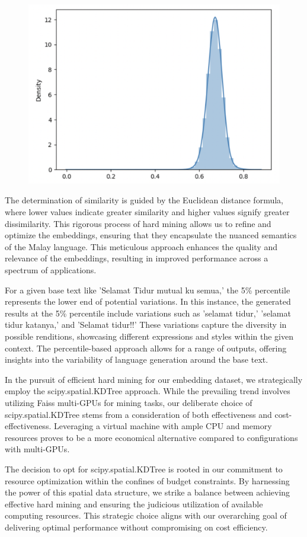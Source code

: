 \documentclass[preprint]{article}
\begin{document}
\begin{figure}[h]
  \centering
  \includegraphics[width=0.6\linewidth]{img/distribution.png}
\end{figure}

The determination of similarity is guided by the Euclidean distance formula, where lower values indicate greater similarity and higher values signify greater dissimilarity. This rigorous process of hard mining allows us to refine and optimize the embeddings, ensuring that they encapsulate the nuanced semantics of the Malay language. This meticulous approach enhances the quality and relevance of the embeddings, resulting in improved performance across a spectrum of applications.

For a given base text like 'Selamat Tidur mutual ku semua,' the 5\% percentile represents the lower end of potential variations. In this instance, the generated results at the 5\% percentile include variations such as 'selamat tidur,' 'selamat tidur katanya,' and 'Selamat tidur!!' These variations capture the diversity in possible renditions, showcasing different expressions and styles within the given context. The percentile-based approach allows for a range of outputs, offering insights into the variability of language generation around the base text.

\pagebreak

In the pursuit of efficient hard mining for our embedding dataset, we strategically employ the scipy.spatial.KDTree approach. While the prevailing trend involves utilizing Faiss multi-GPUs for mining tasks, our deliberate choice of scipy.spatial.KDTree stems from a consideration of both effectiveness and cost-effectiveness. Leveraging a virtual machine with ample CPU and memory resources proves to be a more economical alternative compared to configurations with multi-GPUs.

The decision to opt for scipy.spatial.KDTree is rooted in our commitment to resource optimization within the confines of budget constraints. By harnessing the power of this spatial data structure, we strike a balance between achieving effective hard mining and ensuring the judicious utilization of available computing resources. This strategic choice aligns with our overarching goal of delivering optimal performance without compromising on cost efficiency.
\end{document}

